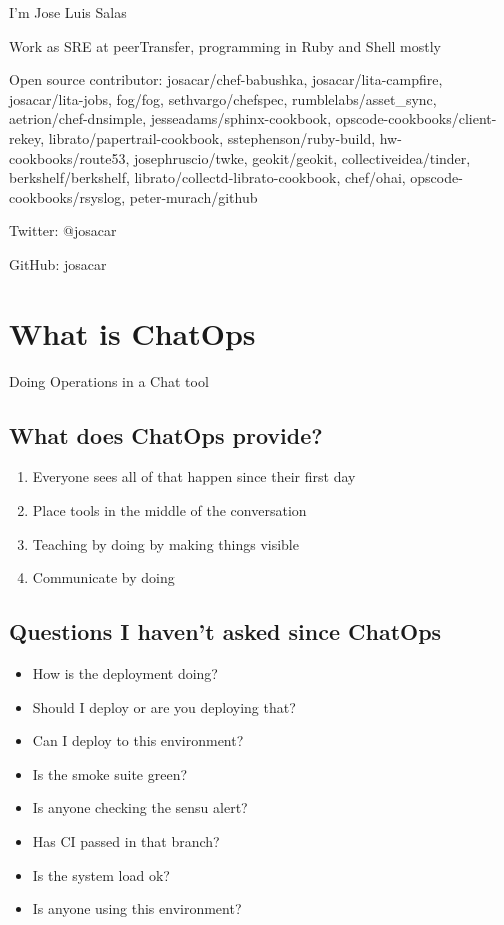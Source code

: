 \documentclass[
paper=128mm:96mm, %
fontsize=11pt, %
pagesize, %
parskip=half-, %
]{scrartcl} %
\theoremstyle{mythmstyle} %
\begin{document}
I'm Jose Luis Salas

Work as SRE at peerTransfer, programming in Ruby and Shell mostly

Open source contributor: josacar/chef-babushka, josacar/lita-campfire, josacar/lita-jobs, fog/fog, sethvargo/chefspec, rumblelabs/asset\_sync, aetrion/chef-dnsimple, jesseadams/sphinx-cookbook, opscode-cookbooks/client-rekey, librato/papertrail-cookbook, sstephenson/ruby-build, hw-cookbooks/route53, josephruscio/twke, geokit/geokit, collectiveidea/tinder, berkshelf/berkshelf, librato/collectd-librato-cookbook, chef/ohai, opscode-cookbooks/rsyslog, peter-murach/github

Twitter: @josacar

GitHub: josacar

\clearpage


\section{What is ChatOps}

Doing Operations in a Chat tool

\subsection{What does ChatOps provide?}

\begin{enumerate}
\item Everyone sees all of that happen since their first day
\item Place tools in the middle of the conversation
\item Teaching by doing by making things visible
\item Communicate by doing
\end{enumerate}

\clearpage


\subsection{Questions I haven't asked since ChatOps}
\begin{itemize}
\item How is the deployment doing?
\item Should I deploy or are you deploying that?
\item Can I deploy to this environment?
\item Is the smoke suite green?
\item Is anyone checking the sensu alert?
\item Has CI passed in that branch?
\item Is the system load ok?
\item Is anyone using this environment?
\end{itemize}
\end{document}
